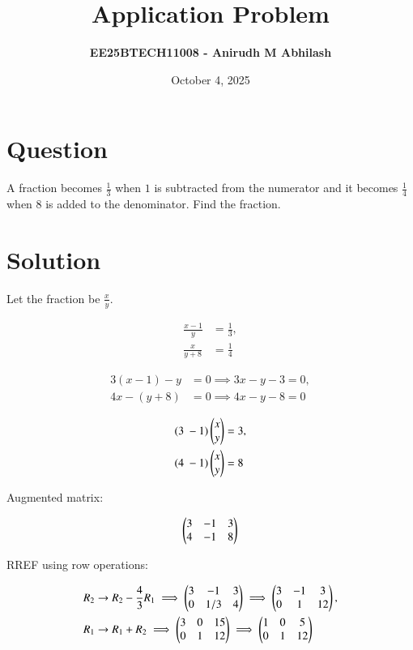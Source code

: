 \documentclass[12pt]{article}
\title{\textbf{Application Problem}}
\author{\textbf{EE25BTECH11008 - Anirudh M Abhilash}}
\date{October 4, 2025}
\begin{document}
\maketitle

\section*{Question}

A fraction becomes $\frac{1}{3}$ when $1$ is subtracted from the numerator and it becomes $\frac{1}{4}$ when $8$ is added to the denominator. Find the fraction.

\section*{Solution}

Let the fraction be $\frac{x}{y}$.  

\begin{align}
\frac{x-1}{y} &= \frac{1}{3}, \\
\frac{x}{y+8} &= \frac{1}{4}
\end{align}

\begin{align}
3(x-1) - y &= 0 \implies 3x - y - 3 = 0, \\
4x - (y+8) &= 0 \implies 4x - y - 8 = 0
\end{align}

\begin{align}
(3 \ -1) \begin{pmatrix}x \\ y\end{pmatrix} &= 3, \\
(4 \ -1) \begin{pmatrix}x \\ y\end{pmatrix} &= 8
\end{align}

Augmented matrix:

\begin{align}
\begin{pmatrix}3 & -1 & 3 \\ 4 & -1 & 8\end{pmatrix}
\end{align}

RREF using row operations:

\begin{align}
R_2 &\to R_2 - \frac{4}{3} R_1 \implies 
\begin{pmatrix}3 & -1 & 3 \\ 0 & 1/3 & 4\end{pmatrix} \implies
\begin{pmatrix}3 & -1 & 3 \\ 0 & 1 & 12\end{pmatrix}, \\
R_1 &\to R_1 + R_2 \implies 
\begin{pmatrix}3 & 0 & 15 \\ 0 & 1 & 12\end{pmatrix} \implies
\begin{pmatrix}1 & 0 & 5 \\ 0 & 1 & 12\end{pmatrix}
\end{align}
\end{document}
